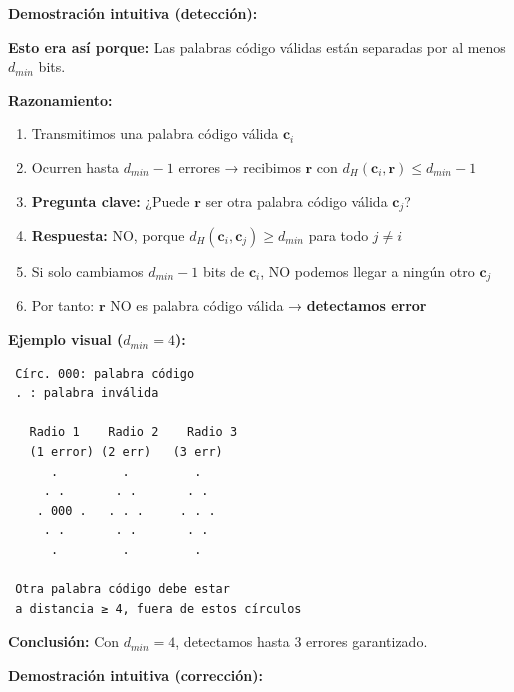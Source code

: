 \documentclass[10pt,a4paper]{article}
\begin{document}
\textbf{Demostración intuitiva (detección):}

\begin{tcolorbox}[colback=verdeclaro!10,colframe=verdeclaro,title=🔍 Demostración - Detección]
\textbf{Esto era así porque:} Las palabras código válidas están separadas por al menos $d_{min}$ bits.

\textbf{Razonamiento:}
\begin{enumerate}
\item Transmitimos una palabra código válida $\mathbf{c}_i$
\item Ocurren hasta $d_{min}-1$ errores → recibimos $\mathbf{r}$ con $d_H(\mathbf{c}_i, \mathbf{r}) \leq d_{min}-1$
\item \textbf{Pregunta clave:} ¿Puede $\mathbf{r}$ ser otra palabra código válida $\mathbf{c}_j$?
\item \textbf{Respuesta:} NO, porque $d_H(\mathbf{c}_i, \mathbf{c}_j) \geq d_{min}$ para todo $j \neq i$
\item Si solo cambiamos $d_{min}-1$ bits de $\mathbf{c}_i$, NO podemos llegar a ningún otro $\mathbf{c}_j$
\item Por tanto: $\mathbf{r}$ NO es palabra código válida → \textbf{detectamos error}
\end{enumerate}

\textbf{Ejemplo visual ($d_{min}=4$):}
\begin{verbatim}
 Círc. 000: palabra código
 . : palabra inválida

   Radio 1    Radio 2    Radio 3
   (1 error) (2 err)   (3 err)
      .         .         .
     . .       . .       . .
    . 000 .   . . .     . . .
     . .       . .       . .
      .         .         .

 Otra palabra código debe estar
 a distancia ≥ 4, fuera de estos círculos
\end{verbatim}

\textbf{Conclusión:} Con $d_{min}=4$, detectamos hasta 3 errores garantizado.
\end{tcolorbox}

\textbf{Demostración intuitiva (corrección):}
\end{document}
